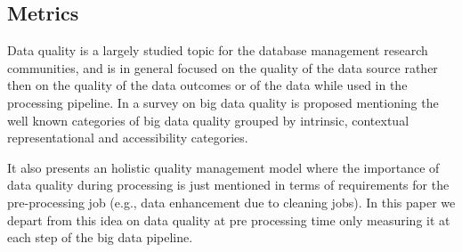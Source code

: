 
\subsection{Metrics}

Data quality is a largely studied topic for the database management research communities,
and is in general focused on the quality of the data source rather then on the quality of the data outcomes or of the data while used in the processing pipeline.
In \cite{BigDataQaulitySurvey} a survey on big data quality is proposed mentioning the well known categories of big data quality grouped by intrinsic,
contextual representational and accessibility categories.

It also presents an holistic quality management model where the importance of data quality during processing is just mentioned in terms of requirements for the pre-processing job (e.g., data enhancement due to cleaning jobs).
In this paper we depart from this idea on data quality at pre processing time only measuring it at each step of the big data pipeline.


